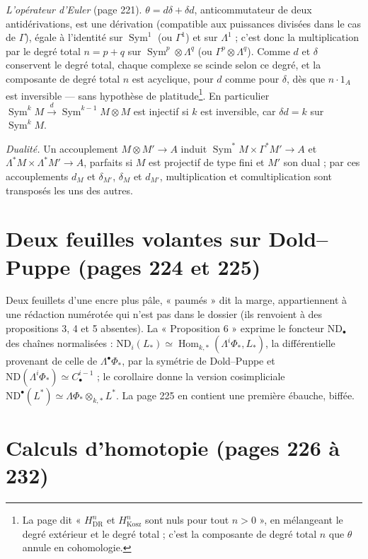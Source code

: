 \documentclass[11pt,a4paper]{article}
\begin{document}
\emph{L'opérateur d'Euler} (page 221). $\theta = d\delta + \delta d$, anticommutateur
de deux antidérivations, est une dérivation (compatible aux puissances divisées
dans le cas de $\Gamma$), égale à l'identité sur $\operatorname{Sym}^1$ (ou
$\Gamma^1$) et sur $\Lambda^1$ ; c'est donc la multiplication par le degré total
$n = p + q$ sur $\operatorname{Sym}^p \otimes \Lambda^q$ (ou $\Gamma^p \otimes
\Lambda^q$). Comme $d$ et $\delta$ conservent le degré total, chaque complexe se
scinde selon ce degré, et la composante de degré total $n$ est acyclique, pour
$d$ comme pour $\delta$, dès que $n \cdot 1_A$ est inversible — sans hypothèse
de platitude\footnote{La page dit « $H^n_{\mathrm{DR}}$ et $H^n_{\mathrm{Kosz}}$
sont nuls pour tout $n > 0$ », en mélangeant le degré extérieur et le degré
total ; c'est la composante de degré total $n$ que $\theta$ annule en
cohomologie.}. En particulier $\operatorname{Sym}^kM \xrightarrow{d}
\operatorname{Sym}^{k-1}M \otimes M$ est injectif si $k$ est inversible, car
$\delta d = k$ sur $\operatorname{Sym}^kM$.

\emph{Dualité.} Un accouplement $M \otimes M' \to A$ induit
$\operatorname{Sym}^*M \times \Gamma^*M' \to A$ et $\Lambda^*M \times \Lambda^*M'
\to A$, parfaits si $M$ est projectif de type fini et $M'$ son dual ; par ces
accouplements $d_M$ et $\delta_{M'}$, $\delta_M$ et $d_{M'}$, multiplication et
comultiplication sont transposés les uns des autres.

\section*{Deux feuilles volantes sur Dold--Puppe (pages 224 et 225)}

Deux feuillets d'une encre plus pâle, « paumés » dit la marge, appartiennent à
une rédaction numérotée qui n'est pas dans le dossier (ils renvoient à des
propositions 3, 4 et 5 absentes). La « Proposition 6 » exprime le foncteur
$\mathrm{ND}_\bullet$ des chaînes normalisées : $\mathrm{ND}_i(L_*) \simeq
\operatorname{Hom}_{k,*}(\Lambda^i\Phi_*, L_*)$, la différentielle provenant de
celle de $\Lambda^\bullet\Phi_*$, par la symétrie de Dold–Puppe et
$\mathrm{ND}(\Lambda^i\Phi_*) \simeq C^{i-1}_\bullet$ ; le corollaire donne la
version cosimpliciale $\mathrm{ND}^\bullet(L^*) \simeq \Lambda\Phi_* \otimes_{k,*}
L^*$. La page 225 en contient une première ébauche, biffée.

\section*{Calculs d'homotopie (pages 226 à 232)}
\end{document}
